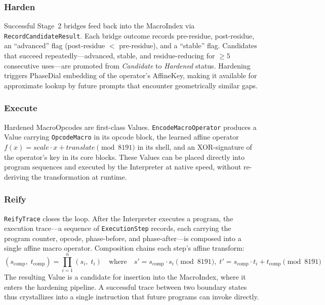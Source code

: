 \subsubsection{Harden}

Successful Stage~2 bridges feed back into the MacroIndex via
\texttt{RecordCandidateResult}.  Each bridge outcome records pre-residue,
post-residue, an ``advanced'' flag (post-residue $<$ pre-residue), and a
``stable'' flag.  Candidates that succeed repeatedly---advanced, stable, and
residue-reducing for $\ge 5$ consecutive uses---are promoted from
\emph{Candidate} to \emph{Hardened} status.  Hardening triggers PhaseDial
embedding of the operator's AffineKey, making it available for approximate
lookup by future prompts that encounter geometrically similar gaps.

\subsubsection{Execute}

Hardened MacroOpcodes are first-class Values.  \texttt{EncodeMacroOperator}
produces a Value carrying \texttt{OpcodeMacro} in its opcode block, the
learned affine operator $f(x) = \mathit{scale} \cdot x + \mathit{translate}
\pmod{8191}$ in its shell, and an XOR-signature of the operator's key in its
core blocks.  These Values can be placed directly into program sequences and
executed by the Interpreter at native speed, without re-deriving the
transformation at runtime.

\subsubsection{Reify}

\texttt{ReifyTrace} closes the loop.  After the Interpreter executes a
program, the execution trace---a sequence of \texttt{ExecutionStep} records,
each carrying the program counter, opcode, phase-before, and
phase-after---is composed into a single affine macro operator.  Composition
chains each step's affine transform:
\begin{equation}
  (s_{\mathrm{comp}},\; t_{\mathrm{comp}})
  = \prod_{i=1}^{n} (s_i,\; t_i)
  \quad\text{where}\quad
  s' = s_{\mathrm{comp}} \cdot s_i \!\!\pmod{8191},\;
  t' = s_{\mathrm{comp}} \cdot t_i + t_{\mathrm{comp}} \!\!\pmod{8191}
  \label{eq:reify}
\end{equation}
The resulting Value is a candidate for insertion into the MacroIndex, where
it enters the hardening pipeline.  A successful trace between two boundary
states thus crystallizes into a single instruction that future programs can
invoke directly.

